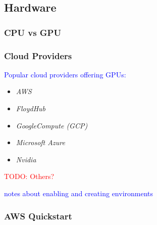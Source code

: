 \subsection{Hardware}

\subsubsection{CPU vs GPU}

\subsubsection{Cloud Providers}

\textcolor{blue}{Popular cloud providers offering GPUs:}

\begin{itemize}
	\item \emph{AWS}~\cite{cloudHW_amazon_aws}
	\item \emph{FloydHub}~\cite{cloudHW_floydhub}
	\item \emph{GoogleCompute (GCP)}~\cite{cloudHW_google_cloud}
	\item \emph{Microsoft Azure}~\cite{cloudHW_micro_azure} 
	\item \emph{Nvidia}~\cite{cloudHW_nvidia_cloud}
\end{itemize}

\textcolor{red}{TODO: Others?}

\textcolor{blue}{notes about enabling and creating environments}

\subsubsection{AWS Quickstart}